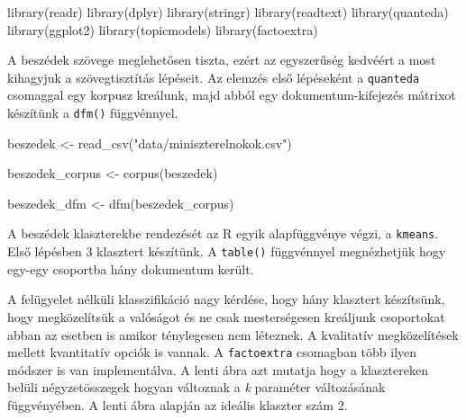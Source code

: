 \documentclass[
]{book}
\newenvironment{Shaded}{\begin{snugshade}}{\end{snugshade}}
\newcommand{\AttributeTok}[1]{\textcolor[rgb]{0.77,0.63,0.00}{#1}}
\newcommand{\CommentTok}[1]{\textcolor[rgb]{0.56,0.35,0.01}{\textit{#1}}}
\newcommand{\DecValTok}[1]{\textcolor[rgb]{0.00,0.00,0.81}{#1}}
\newcommand{\FunctionTok}[1]{\textcolor[rgb]{0.00,0.00,0.00}{#1}}
\newcommand{\NormalTok}[1]{#1}
\newcommand{\OtherTok}[1]{\textcolor[rgb]{0.56,0.35,0.01}{#1}}
\newcommand{\SpecialCharTok}[1]{\textcolor[rgb]{0.00,0.00,0.00}{#1}}
\newcommand{\StringTok}[1]{\textcolor[rgb]{0.31,0.60,0.02}{#1}}
\begin{document}
\begin{Shaded}
\begin{Highlighting}[]

\FunctionTok{library}\NormalTok{(readr)}
\FunctionTok{library}\NormalTok{(dplyr)}
\FunctionTok{library}\NormalTok{(stringr)}
\FunctionTok{library}\NormalTok{(readtext)}
\FunctionTok{library}\NormalTok{(quanteda)}
\FunctionTok{library}\NormalTok{(ggplot2)}
\FunctionTok{library}\NormalTok{(topicmodels)}
\FunctionTok{library}\NormalTok{(factoextra)}
\end{Highlighting}
\end{Shaded}

A beszédek szövege meglehetősen tiszta, ezért az egyszerűség kedvéért a
most kihagyjuk a szövegtisztítás lépéseit. Az elemzés első lépéseként a
\texttt{quanteda} csomaggal egy korpusz kreálunk, majd abból egy
dokumentum-kifejezés mátrixot készítünk a \texttt{dfm()} függvénnyel.

\begin{Shaded}
\begin{Highlighting}[]
\NormalTok{beszedek }\OtherTok{\textless{}{-}} \FunctionTok{read\_csv}\NormalTok{(}\StringTok{"data/miniszterelnokok.csv"}\NormalTok{)}

\NormalTok{beszedek\_corpus }\OtherTok{\textless{}{-}} \FunctionTok{corpus}\NormalTok{(beszedek)}

\NormalTok{beszedek\_dfm }\OtherTok{\textless{}{-}} \FunctionTok{dfm}\NormalTok{(beszedek\_corpus)}
\end{Highlighting}
\end{Shaded}

A beszédek klaszterekbe rendezését az R egyik alapfüggvénye végzi, a
\texttt{kmeans}. Első lépésben 3 klasztert készítünk. A \texttt{table()}
függvénnyel megnézhetjük hogy egy-egy csoportba hány dokumentum került.

\begin{Shaded}
\end{Shaded}

A felügyelet nélküli klasszifikáció nagy kérdése, hogy hány klasztert
készítsünk, hogy megközelítsük a valóságot és ne csak mesterségesen
kreáljunk csoportokat abban az esetben is amikor ténylegesen nem
léteznek. A kvalitatív megközelítések mellett kvantitatív opciók is
vannak. A \texttt{factoextra} csomagban több ilyen módszer is van
implementálva. A lenti ábra azt mutatja hogy a klasztereken belüli
négyzetösszegek hogyan változnak a \emph{k} paraméter változásának
függvényében. A lenti ábra alapján az ideális klaszter szám 2.
\end{document}
